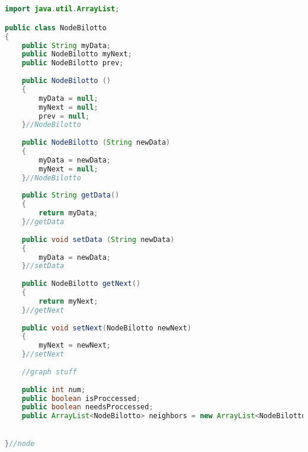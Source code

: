 \documentclass[letterpaper, 10pt]{article}
\begin{document}
\begin{lstlisting}[language = java]


import java.util.ArrayList;

public class NodeBilotto 
{
	public String myData;
	public NodeBilotto myNext;
	public NodeBilotto prev;
	
	public NodeBilotto ()
	{
		myData = null;
		myNext = null;
		prev = null;
	}//NodeBilotto
	
	public NodeBilotto (String newData)
	{
		myData = newData;
		myNext = null;
	}//NodeBilotto
	
	public String getData()
	{
		return myData;
	}//getData
	
	public void setData (String newData)
	{
		myData = newData;
	}//setData
	
	public NodeBilotto getNext()
	{
		return myNext;
	}//getNext
	
	public void setNext(NodeBilotto newNext)
	{
		myNext = newNext;
	}//setNext
	
	//graph stuff
	
	public int num;
	public boolean isProccessed;
	public boolean needsProccessed;
	public ArrayList<NodeBilotto> neighbors = new ArrayList<NodeBilotto>();

	
}//node




\end{lstlisting}
\end{document}
